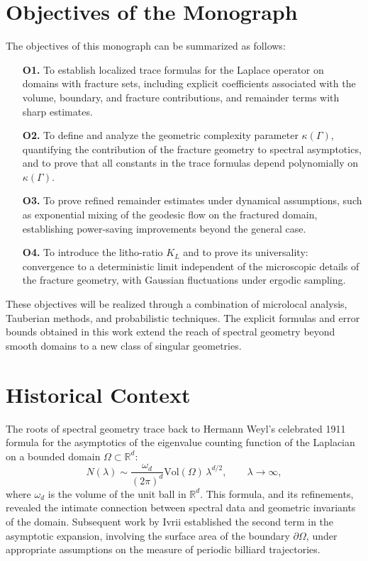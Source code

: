 \section{Objectives of the Monograph}

The objectives of this monograph can be summarized as follows:

\begin{itemize}
  \item[\textbf{O1.}] To establish localized trace formulas for the Laplace
  operator on domains with fracture sets, including explicit coefficients
  associated with the volume, boundary, and fracture contributions, and
  remainder terms with sharp estimates.

  \item[\textbf{O2.}] To define and analyze the geometric complexity
  parameter $\kappa(\Gamma)$, quantifying the contribution of the fracture
  geometry to spectral asymptotics, and to prove that all constants in the
  trace formulas depend polynomially on $\kappa(\Gamma)$.

  \item[\textbf{O3.}] To prove refined remainder estimates under dynamical
  assumptions, such as exponential mixing of the geodesic flow on the
  fractured domain, establishing power-saving improvements beyond the
  general case.

  \item[\textbf{O4.}] To introduce the litho-ratio $K_L$ and to prove its
  universality: convergence to a deterministic limit independent of the
  microscopic details of the fracture geometry, with Gaussian fluctuations
  under ergodic sampling.
\end{itemize}

These objectives will be realized through a combination of microlocal
analysis, Tauberian methods, and probabilistic techniques. The explicit
formulas and error bounds obtained in this work extend the reach of
spectral geometry beyond smooth domains to a new class of singular
geometries.

\section{Historical Context}

The roots of spectral geometry trace back to Hermann Weyl's celebrated
1911 formula for the asymptotics of the eigenvalue counting function of
the Laplacian on a bounded domain $\Omega \subset \mathbb{R}^d$:
\[
  N(\lambda) \sim \frac{\omega_d}{(2\pi)^d} \mathrm{Vol}(\Omega) \, \lambda^{d/2},
  \qquad \lambda \to \infty,
\]
where $\omega_d$ is the volume of the unit ball in $\mathbb{R}^d$.
This formula, and its refinements, revealed the intimate connection
between spectral data and geometric invariants of the domain. Subsequent
work by Ivrii established the second term in the asymptotic expansion,
involving the surface area of the boundary $\partial \Omega$, under
appropriate assumptions on the measure of periodic billiard trajectories.

